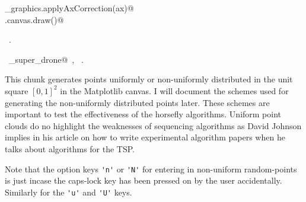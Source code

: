 \documentclass[11.5pt]{report}
\begin{document}
\begin{flushleft}
\begin{minipage}{\linewidth}
\begin{list}{}{}
\mbox{}\verb@utils_graphics.applyAxCorrection(ax)@\\
\mbox{}\verb@fig.canvas.draw()@\\
\mbox{}\verb@@{\NWsep}
\end{list}
\vspace{-1.5ex}
\footnotesize
\begin{list}{}{\setlength{\itemsep}{-\parsep}\setlength{\itemindent}{-\leftmargin}}
\item \NWtxtMacroRefIn\ .
\item \NWtxtIdentsUsed\nobreak\  \verb@algo_super_drone@\nobreak\ , \verb@getTour@\nobreak\ .
\item{}
\end{list}
\end{minipage}\vspace{4ex}
\end{flushleft}

\vspace{-0.8cm}\newchunk This chunk generates points uniformly or non-uniformly distributed in the 
unit square $[0,1]^2$ in the Matplotlib canvas. I will document the schemes used for 
generating the non-uniformly distributed points later. These schemes are important to test the effectiveness of 
the horsefly algorithms. Uniform point clouds do no highlight the weaknesses of 
sequencing algorithms as David Johnson implies in his article on how to write 
experimental algorithm papers when he talks about algorithms for the TSP. 

Note that the option keys \verb|'n'| or \verb|'N'| for entering in non-uniform random-points is just 
incase the caps-lock key has been pressed on by the user accidentally. Similarly for the \verb|'u'|
and \verb|'U'| keys.  
\end{document}
